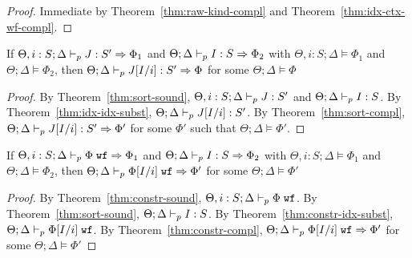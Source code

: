 \kindcompl*
\begin{proof}
Immediate by Theorem~\ref{thm:raw-kind-compl} and Theorem~\ref{thm:idx-ctx-wf-compl}.
\end{proof}

\subtynerefl*


\subtynfrefl*


\subtynftrans*



\begin{theorem}
If $\Theta, i : S ; \Delta \vdash_p J : S' \Rightarrow \Phi_1$ and $\Theta ; \Delta \vdash_p I : S \Rightarrow \Phi_2$ with
$\Theta, i : S ; \Delta \vDash \Phi_1$ and $\Theta; \Delta \vDash \Phi_2$, then
$\Theta ; \Delta \vdash_p J[I/i] : S' \Rightarrow \Phi$ for some $\Theta ; \Delta \vDash \Phi$
\label{idx-idx-algo-subst}
\end{theorem}
\begin{proof}
By Theorem~\ref{thm:sort-sound}, $\Theta, i :S ; \Delta \vdash_p J : S'$ and $\Theta ; \Delta \vdash_p I : S$.
By Theorem~\ref{thm:idx-idx-subst}, $\Theta ; \Delta \vdash_p J[I/i] : S'$.
By Theorem~\ref{thm:sort-compl}, $\Theta ; \Delta \vdash_p J[I/i] : S' \Rightarrow \Phi'$ for some $\Phi'$ such that $\Theta ; \Delta \vDash \Phi'$.
\end{proof}

\begin{theorem}
If $\Theta, i : S; \Delta \vdash_p \Phi \; \texttt{wf} \Rightarrow \Phi_1$ and $\Theta ; \Delta \vdash_p I : S \Rightarrow \Phi_2$
with $\Theta, i : S ; \Delta \vDash \Phi_1$ and $\Theta ; \Delta \vDash \Phi_2$, then
$\Theta ; \Delta \vdash_p  \Phi[I/i] \; \texttt{wf} \Rightarrow \Phi'$ for some $\Theta ; \Delta \vDash \Phi'$
\label{thm:constr-idx-algo-subst}
\end{theorem}
\begin{proof}
By Theorem~\ref{thm:constr-sound}, $\Theta, i : S ; \Delta \vdash_p \Phi \; \texttt{wf}$.
By Theorem~\ref{thm:sort-sound}, $\Theta ; \Delta \vdash_p I : S$.
By Theorem~\ref{thm:constr-idx-subst}, $\Theta ; \Delta \vdash_p \Phi[I/i] \; \texttt{wf}$.
By Theorem~\ref{thm:constr-compl}, $\Theta ; \Delta \vdash_p \Phi[I/i] \; \texttt{wf} \Rightarrow \Phi'$ for some $\Theta ; \Delta \vDash \Phi'$
\end{proof}

